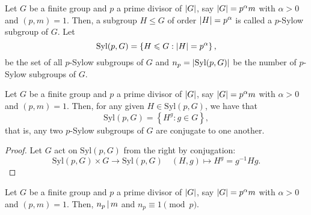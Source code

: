\begin{definition}\label{def:p-sylow-subgroups}
  Let \(G\) be a finite group and \(p\) a prime divisor of \(\lvert G\rvert\), say \(\lvert G\rvert=p^{\alpha}m\) with \({\alpha}>{0}\) and \((p,m)=1\). Then, a subgroup \({H}\leqslant{G}\) of order \(\lvert H\rvert=p^{\alpha}\) is called a \(p\)-Sylow subgroup of \(G\). Let
  \[
    \text{Syl}(p,G)
    =
    \left\{{H}\leqslant{G}:\lvert H\rvert=p^{\alpha}\right\}
    ,
  \]
  be the set of all \(p\)-Sylow subgroups of \(G\) and \(n_{p}=\lvert\text{Syl}(p,G)\rvert\) be the number of \(p\)-Sylow subgroups of \(G\).
\end{definition}

\begin{theorem}\label{thm:second-sylow-theorem}
  Let \(G\) be a finite group and \(p\) a prime divisor of \(\lvert G\rvert\), say \(\lvert G\rvert=p^{\alpha}m\) with \({\alpha}>{0}\) and \((p,m)=1\). Then, for any given \({H}\in{\text{Syl}(p,G)}\), we have that
  \[
    \text{Syl}(p,G)
    =
    \left\{H^{g}:{g}\in{G}\right\}
    ,
  \]
  that is, any two \(p\)-Sylow subgroups of \(G\) are conjugate to one another.
\end{theorem}

\begin{proof}
  Let \(G\) act on \(\text{Syl}(p,G)\) from the right by conjugation:
  \[
    \text{Syl}(p,G)\times{G}\to{\text{Syl}(p,G)}
    \quad
    (H,g)\mapsto{H^{g}=g^{-1}Hg}.
  \]
\end{proof}

\begin{theorem}\label{thm:second-sylow-theorem}
  Let \(G\) be a finite group and \(p\) a prime divisor of \(\lvert G\rvert\), say \(\lvert G\rvert=p^{\alpha}m\) with \({\alpha}>{0}\) and \((p,m)=1\). Then, \(n_{p}\,\vert\,{m}\) and \(n_{p}\equiv{1}\pmod{p}\).
\end{theorem}
